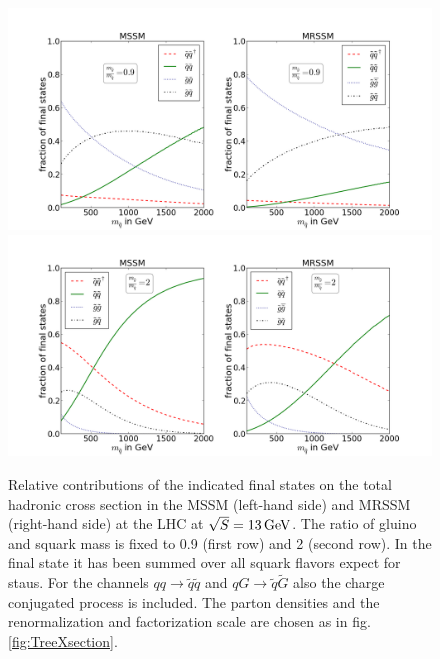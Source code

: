 \begin{figure}[!htpb]
\begin{center}
\includegraphics[scale=.45]{figures/rel_weights_mr=0,9_MSSM+MRSSM}
\includegraphics[scale=.45]{figures/rel_weights_mr=2_MSSM+MRSSM}
\caption{Relative contributions of the indicated final states on the total hadronic cross section in the MSSM (left-hand side) and MRSSM (right-hand side) at the LHC at $\sqrt{S} = \unit[13]{GeV}$. The ratio of gluino and squark mass is fixed to 0.9 (first row) and 2 (second row). In the final state it has been summed over all squark flavors expect for staus. For the channels $qq \to \tilde{q}\tilde{q}$ and $qG \to \tilde{q}\tilde{G}$ also the charge conjugated process is included. The parton densities and the renormalization and factorization scale are chosen as in fig. \ref{fig:TreeXsection}.}
\end{center}
\end{figure}

